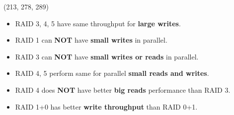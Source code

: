 \begin{theorem}{(213, 278, 289)}
\begin{itemize}
        \item RAID 3, 4, 5 have same throughput for \textbf{large writes}.
        \item RAID 1 can \textbf{NOT} have \textbf{small writes} in parallel.
        \item RAID 3 can \textbf{NOT} have \textbf{small writes or reads} in parallel. 
        \item RAID 4, 5 perform same for parallel \textbf{small reads and writes}. 
        \item RAID 4 does \textbf{NOT} have better \textbf{big reads} performance than RAID 3.
        \item RAID 1+0 has better \textbf{write throughput} than RAID 0+1.
    \end{itemize}
\end{theorem}